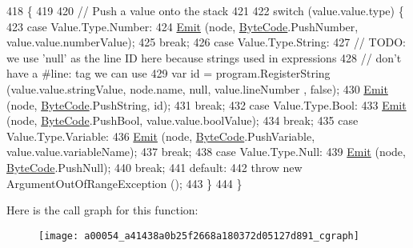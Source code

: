 \begin{DoxyCode}
418                                                              \{
419 
420             \textcolor{comment}{// Push a value onto the stack}
421 
422             \textcolor{keywordflow}{switch} (value.value.type) \{
423             \textcolor{keywordflow}{case} Value.Type.Number:
424                 \hyperlink{a00054_a774e8c143cdda0584fcfdda98626a83c}{Emit} (node, \hyperlink{a00051_ad5dfb6ee68ca7469623ad3e459f98894}{ByteCode}.PushNumber, value.value.numberValue);
425                 \textcolor{keywordflow}{break};
426             \textcolor{keywordflow}{case} Value.Type.String:
427                 \textcolor{comment}{// TODO: we use 'null' as the line ID here because strings used in expressions}
428                 \textcolor{comment}{// don't have a #line: tag we can use}
429                 var \textcolor{keywordtype}{id} = program.RegisterString (value.value.stringValue, node.name, null, value.lineNumber
      , \textcolor{keyword}{false});
430                 \hyperlink{a00054_a774e8c143cdda0584fcfdda98626a83c}{Emit} (node, \hyperlink{a00051_ad5dfb6ee68ca7469623ad3e459f98894}{ByteCode}.PushString, \textcolor{keywordtype}{id});
431                 \textcolor{keywordflow}{break};
432             \textcolor{keywordflow}{case} Value.Type.Bool:
433                 \hyperlink{a00054_a774e8c143cdda0584fcfdda98626a83c}{Emit} (node, \hyperlink{a00051_ad5dfb6ee68ca7469623ad3e459f98894}{ByteCode}.PushBool, value.value.boolValue);
434                 \textcolor{keywordflow}{break};
435             \textcolor{keywordflow}{case} Value.Type.Variable:
436                 \hyperlink{a00054_a774e8c143cdda0584fcfdda98626a83c}{Emit} (node, \hyperlink{a00051_ad5dfb6ee68ca7469623ad3e459f98894}{ByteCode}.PushVariable, value.value.variableName);
437                 \textcolor{keywordflow}{break};
438             \textcolor{keywordflow}{case} Value.Type.Null:
439                 \hyperlink{a00054_a774e8c143cdda0584fcfdda98626a83c}{Emit} (node, \hyperlink{a00051_ad5dfb6ee68ca7469623ad3e459f98894}{ByteCode}.PushNull);
440                 \textcolor{keywordflow}{break};
441             \textcolor{keywordflow}{default}:
442                 \textcolor{keywordflow}{throw} \textcolor{keyword}{new} ArgumentOutOfRangeException ();
443             \}
444         \}
\end{DoxyCode}


Here is the call graph for this function\-:
\nopagebreak
\begin{figure}[H]
\begin{center}
\leavevmode
\texttt{[image: a00054\_a41438a0b25f2668a180372d05127d891\_cgraph]}
\end{center}
\end{figure}



